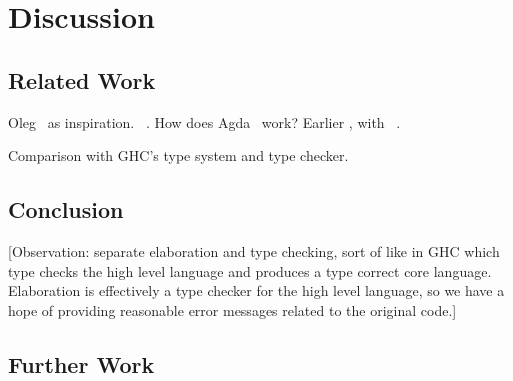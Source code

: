 \section{Discussion}

\label{sect:discussion}

\subsection{Related Work}

Oleg~\cite{McBride1999} as inspiration. \Epigram{}~\cite{McBride2004a}.
How does Agda~\cite{norell2007thesis} work?
Earlier \Idris{}, with \Ivor{}~\cite{Brady2006b}.

Comparison with GHC's type system and type checker.

\subsection{Conclusion}

[Observation: separate elaboration and type checking, sort of like in GHC which
type checks the high level language and produces a type correct core language.
Elaboration is effectively a type checker for the high level language, so we have
a hope of providing reasonable error messages related to the original code.]

\subsection{Further Work}
